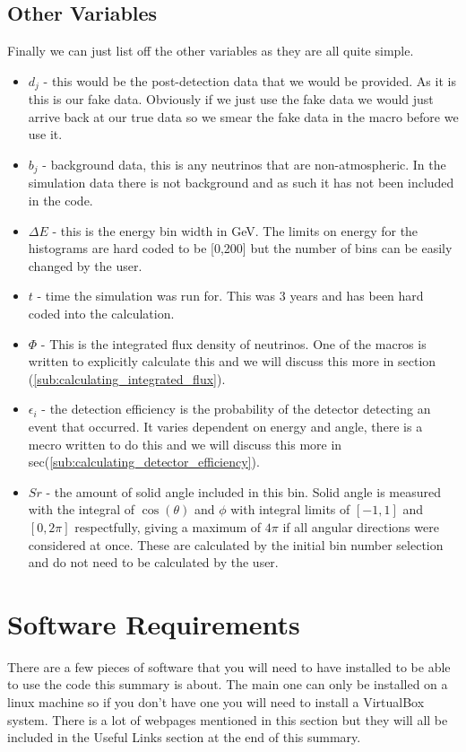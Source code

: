 \documentclass[12pt]{article}
\numberwithin{equation}{section}
\numberwithin{figure}{section}
\begin{document}
\subsection{Other Variables} 
Finally we can just list off the other variables as they are all quite simple.
\begin{itemize}
	\item $d_j$ - this would be the post-detection data that we would be provided. As it is this is our fake data. Obviously if we just use the fake data we would just arrive back at our true data so we smear the fake data in the macro before we use it.
	\item $b_j$ - background data, this is any neutrinos that are non-atmospheric. In the simulation data there is not background and as such it has not been included in the code.
	\item $\Delta E$ - this is the energy bin width in GeV. The limits on energy for the histograms are hard coded to be [0,200] but the number of bins can be easily changed by the user.
	\item $t$ - time the simulation was run for. This was 3 years and has been hard coded into the calculation.
	\item $\Phi$ - This is the integrated flux density of neutrinos. One of the macros is written to explicitly calculate this and we will discuss this more in section (\ref{sub:calculating_integrated_flux}).
	\item $\epsilon_i$ - the detection efficiency is the probability of the detector detecting an event that occurred. It varies dependent on energy and angle, there is a mecro written to do this and we will discuss this more in sec(\ref{sub:calculating_detector_efficiency}).
	\item $Sr$ - the amount of solid angle included in this bin. Solid angle is measured with the integral of $\cos(\theta)$ and $\phi$ with integral limits of $[-1,1]$ and $[0,2\pi]$ respectfully, giving a maximum of $4\pi$ if all angular directions were considered at once. These are calculated by the initial bin number selection and do not need to be calculated by the user.
\end{itemize}

\section{Software Requirements} %
\label{sec:software_requirements}
There are a few pieces of software that you will need to have installed to be able to use the code this summary is about. The main one can only be installed on a linux machine so if you don't have one you will need to install a VirtualBox system. There is a lot of webpages mentioned in this section but they will all be included in the Useful Links section at the end of this summary.
%
\end{document}
